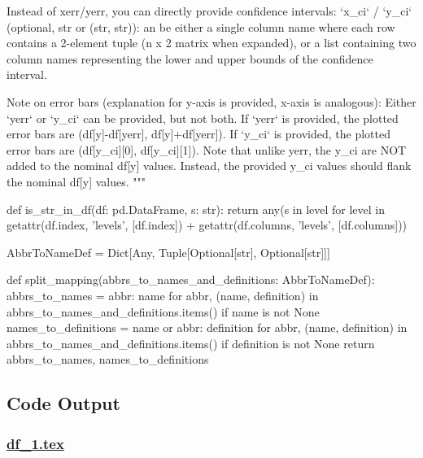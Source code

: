 \documentclass[11pt]{article}
\begin{document}
\begin{python}
    Instead of xerr/yerr, you can directly provide confidence intervals:
    `x_ci` / `y_ci` (optional, str or (str, str)): an be either a single column name where each row contains
        a 2-element tuple (n x 2 matrix when expanded), or a list containing two column names 
        representing the lower and upper bounds of the confidence interval.

    Note on error bars (explanation for y-axis is provided, x-axis is analogous):
    Either `yerr` or `y_ci` can be provided, but not both.
    If `yerr` is provided, the plotted error bars are (df[y]-df[yerr], df[y]+df[yerr]).
    If `y_ci` is provided, the plotted error bars are (df[y_ci][0], df[y_ci][1]).
    Note that unlike yerr, the y_ci are NOT added to the nominal df[y] values. 
    Instead, the provided y_ci values should flank the nominal df[y] values.
    """

def is_str_in_df(df: pd.DataFrame, s: str):
    return any(s in level for level in getattr(df.index, 'levels', [df.index]) + getattr(df.columns, 'levels', [df.columns]))

AbbrToNameDef = Dict[Any, Tuple[Optional[str], Optional[str]]]

def split_mapping(abbrs_to_names_and_definitions: AbbrToNameDef):
    abbrs_to_names = {abbr: name for abbr, (name, definition) in abbrs_to_names_and_definitions.items() if name is not None}
    names_to_definitions = {name or abbr: definition for abbr, (name, definition) in abbrs_to_names_and_definitions.items() if definition is not None}
    return abbrs_to_names, names_to_definitions

\end{python}



\subsection{Code Output}

\subsubsection*{\hyperlink{code-LaTeX Table Design-df-1-tex}{df\_1.tex}}
\end{document}
